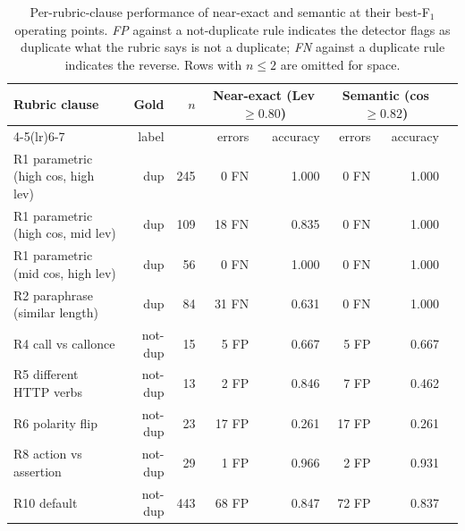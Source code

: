 \documentclass[11pt,a4paper]{article}
\begin{document}
\begin{table}[h]
\centering
\caption{Per-rubric-clause performance of near-exact and semantic at
their best-F$_1$ operating points. \emph{FP} against a
not-duplicate rule indicates the detector flags as duplicate what
the rubric says is not a duplicate; \emph{FN} against a duplicate
rule indicates the reverse. Rows with $n \leq 2$ are omitted for
space.}
\label{tab:per-rule}
\footnotesize
\setlength{\tabcolsep}{3.5pt}
\begin{tabular}{lrrrrrrr}
\toprule
Rubric clause & Gold & $n$ & \multicolumn{2}{c}{Near-exact (Lev $\geq 0.80$)} & \multicolumn{2}{c}{Semantic (cos $\geq 0.82$)} \\
\cmidrule(lr){4-5}\cmidrule(lr){6-7}
 & label & & errors & accuracy & errors & accuracy \\
\midrule
R1 parametric (high cos, high lev) & dup     & 245 & 0 FN              & 1.000 & 0 FN              & 1.000 \\
R1 parametric (high cos, mid lev)  & dup     & 109 & 18 FN             & 0.835 & 0 FN              & 1.000 \\
R1 parametric (mid cos, high lev)  & dup     &  56 & 0 FN              & 1.000 & 0 FN              & 1.000 \\
R2 paraphrase (similar length)     & dup     &  84 & 31 FN             & 0.631 & 0 FN              & 1.000 \\
R4 call vs callonce                & not-dup &  15 & 5 FP              & 0.667 & 5 FP              & 0.667 \\
R5 different HTTP verbs            & not-dup &  13 & 2 FP              & 0.846 & 7 FP              & 0.462 \\
R6 polarity flip                   & not-dup &  23 & 17 FP             & 0.261 & 17 FP             & 0.261 \\
R8 action vs assertion             & not-dup &  29 & 1 FP              & 0.966 & 2 FP              & 0.931 \\
R10 default                        & not-dup & 443 & 68 FP             & 0.847 & 72 FP             & 0.837 \\
\bottomrule
\end{tabular}
\end{table}
\end{document}
